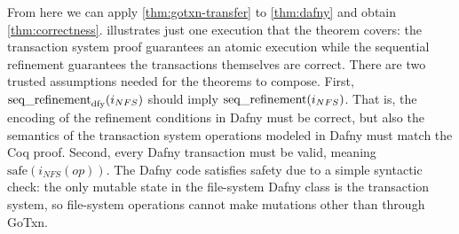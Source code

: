 From here we can apply \cref{thm:gotxn-transfer} to \cref{thm:dafny} and
obtain \cref{thm:correctness}.  illustrates
just one execution that the theorem covers: the transaction system proof guarantees an
atomic execution while the sequential refinement guarantees the transactions
themselves are correct. There are two trusted assumptions needed for the
theorems to compose. First, $\operatorname{seq\_refinement}_{\mathrm{dfy}}(i_{NFS})$ should imply
$\operatorname{seq\_refinement}(i_{NFS})$. That is, the encoding of the refinement
conditions in Dafny must be correct, but also the semantics of the transaction
system operations modeled in Dafny must match the Coq proof. Second, every Dafny
transaction must be valid, meaning $\mathrm{safe}(i_{NFS}(op))$. The Dafny code
satisfies safety due to a simple syntactic check: the only mutable state in the
file-system Dafny class is the transaction system, so file-system operations
cannot make mutations other than through GoTxn.

